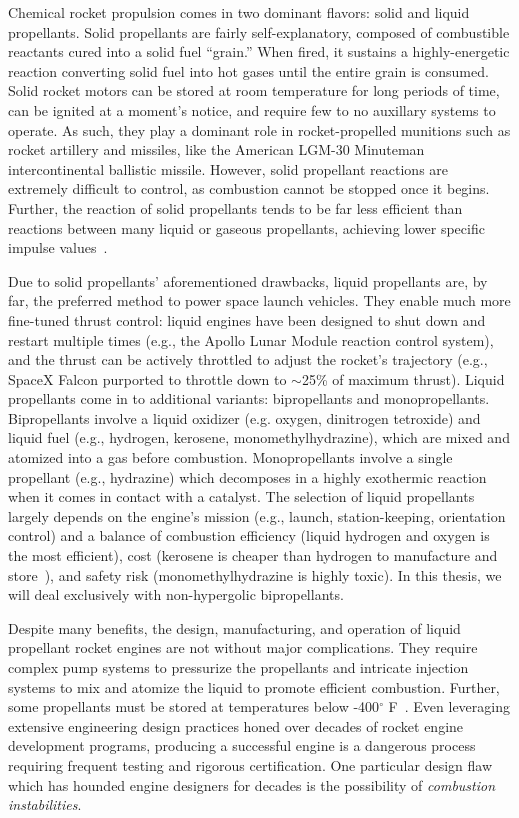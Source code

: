 Chemical rocket propulsion comes in two dominant flavors: solid and liquid propellants. Solid propellants are fairly self-explanatory, composed of combustible reactants cured into a solid fuel ``grain.'' When fired, it sustains a highly-energetic reaction converting solid fuel into hot gases until the entire grain is consumed. Solid rocket motors can be stored at room temperature for long periods of time, can be ignited at a moment's notice, and require few to no auxillary systems to operate. As such, they play a dominant role in rocket-propelled munitions such as rocket artillery and missiles, like the American LGM-30 Minuteman intercontinental ballistic missile. However, solid propellant reactions are extremely difficult to control, as combustion cannot be stopped once it begins. Further, the reaction of solid propellants tends to be far less efficient than reactions between many liquid or gaseous propellants, achieving lower specific impulse values~\cite{Sutton2003}.

Due to solid propellants' aforementioned drawbacks, liquid propellants are, by far, the preferred method to power space launch vehicles. They enable much more fine-tuned thrust control: liquid engines have been designed to shut down and restart multiple times (e.g., the Apollo Lunar Module reaction control system), and the thrust can be actively throttled to adjust the rocket's trajectory (e.g., SpaceX Falcon purported to throttle down to $\sim$25\% of maximum thrust). Liquid propellants come in to additional variants: bipropellants and monopropellants. Bipropellants involve a liquid oxidizer (e.g. oxygen, dinitrogen tetroxide) and liquid fuel (e.g., hydrogen, kerosene, monomethylhydrazine), which are mixed and atomized into a gas before combustion. Monopropellants involve a single propellant (e.g., hydrazine) which decomposes in a highly exothermic reaction when it comes in contact with a catalyst. The selection of liquid propellants largely depends on the engine's mission (e.g., launch, station-keeping, orientation control) and a balance of combustion efficiency (liquid hydrogen and oxygen is the most efficient), cost (kerosene is cheaper than hydrogen to manufacture and store~\cite{propellantCosts}), and safety risk (monomethylhydrazine is highly toxic). In this thesis, we will deal exclusively with non-hypergolic bipropellants.

Despite many benefits, the design, manufacturing, and operation of liquid propellant rocket engines are not without major complications. They require complex pump systems to pressurize the propellants and intricate injection systems to mix and atomize the liquid to promote efficient combustion. Further, some propellants must be stored at temperatures below \mbox{-400$^{\circ}$} F~\cite{liquidHydrogenProps}. Even leveraging extensive engineering design practices honed over decades of rocket engine development programs, producing a successful engine is a dangerous process requiring frequent testing and rigorous certification. One particular design flaw which has hounded engine designers for decades is the possibility of \textit{combustion instabilities}.

